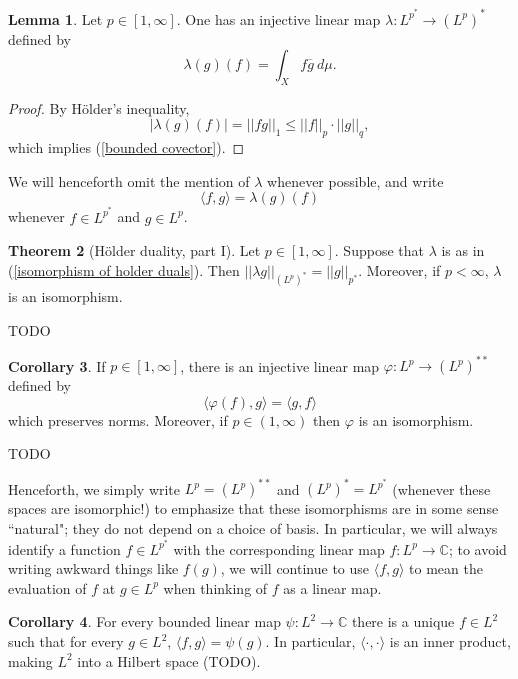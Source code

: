 \documentclass[12pt]{book}
\newcommand{\CC}{\mathbb{C}}
\theoremstyle{definition}
\newtheorem{theorem}{Theorem}[section]
\newtheorem{lemma}[theorem]{Lemma}
\newtheorem{corollary}[theorem]{Corollary}
\begin{document}
\begin{lemma}
Let $p \in [1, \infty]$.
One has an injective linear map $\lambda: L^{p^*} \to (L^p)^*$ defined by
\begin{equation}
\label{isomorphism of holder duals}
\lambda(g)(f) = \int_X f\overline g ~d\mu.
\end{equation}
\end{lemma}
\begin{proof}
By H\"older's inequality,
$$|\lambda(g)(f)| = ||fg||_1 \leq ||f||_p \cdot ||g||_q,$$
which implies (\ref{bounded covector}).
\end{proof}

We will henceforth omit the mention of $\lambda$ whenever possible, and write
$$\langle f, g\rangle = \lambda(g)(f)$$
whenever $f \in L^{p^*}$ and $g \in L^p$.

\begin{theorem}[H\"older duality, part I]
Let $p \in [1, \infty]$.
Suppose that $\lambda$ is as in (\ref{isomorphism of holder duals}).
Then $||\lambda g||_{(L^p)^*} = ||g||_{p^*}$.
Moreover, if $p < \infty$, $\lambda$ is an isomorphism.
\end{theorem}
TODO

\begin{corollary}
If $p \in [1, \infty]$, there is an injective linear map $\varphi: L^p \to (L^p)^{**}$ defined by
$$\langle \varphi(f), g\rangle = \langle g, f\rangle$$
which preserves norms. Moreover, if $p \in (1, \infty)$ then $\varphi$ is an isomorphism.
\end{corollary}
TODO

Henceforth, we simply write $L^p = (L^p)^{**}$ and $(L^p)^* = L^{p^*}$ (whenever these spaces are isomorphic!) to emphasize that these isomorphisms are in some sense ``natural"; they do not depend on a choice of basis.
In particular, we will always identify a function $f \in L^{p^*}$ with the corresponding linear map $f: L^p \to \CC$; to avoid writing awkward things like $f(g)$, we will continue to use $\langle f, g\rangle$ to mean the evaluation of $f$ at $g \in L^p$ when thinking of $f$ as a linear map.

\begin{corollary}
For every bounded linear map $\psi: L^2 \to \CC$ there is a unique $f \in L^2$ such that for every $g \in L^2$, $\langle f, g\rangle = \psi(g)$.
In particular, $\langle \cdot, \cdot \rangle$ is an inner product, making $L^2$ into a Hilbert space (TODO).
\end{corollary}
\end{document}

